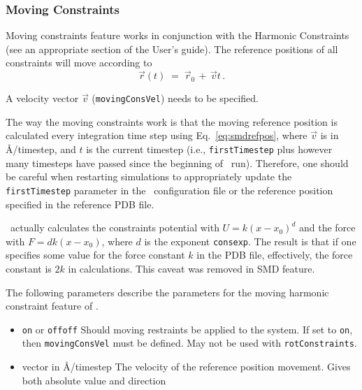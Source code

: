 \subsubsection{Moving Constraints}

Moving constraints feature works in conjunction with the Harmonic
Constraints (see an appropriate section of the User's guide).
The reference positions of all constraints
will move according to
\begin{equation}
\label{eq:smdrefpos}
   \vec r(t) \; = \; \vec r_0 \, + \, \vec v t \,.
\end{equation}

A velocity vector $\vec v$ ({\tt movingConsVel}) needs to be specified.

The way the moving constraints work is that the moving reference
position is calculated every integration time step using
Eq.~\ref{eq:smdrefpos}, where $\vec v$ is in \AA/timestep, and $t$ is the
current timestep (i.e., {\tt firstTimestep} plus however many
timesteps have passed since the beginning of \PDAC\ run). Therefore,
one should be careful when restarting simulations to appropriately
update the {\tt firstTimestep} parameter in the \PDAC\ configuration
file or the reference position specified in the reference PDB file.

 \PDAC\ actually calculates the constraints
potential with $U = k (x-x_0)^d$ and the force with $F = d k (x-x_0)$,
where $d$ is the exponent {\tt consexp}. The result is that if one
specifies some value for the force constant $k$ in the PDB file,
effectively, the force constant is $2 k$ in calculations. This caveat
was removed in SMD feature.

The following parameters describe the parameters for the
moving harmonic constraint feature of \PDAC.

\begin{itemize}

\item
{}
{{\tt on} or {\tt off}}{{\tt off}}
{Should moving restraints be applied to the system. If set
to {\tt on}, then  {\tt movingConsVel} must be defined.
May not be used with {\tt rotConstraints}.}

\item
{}
{vector in \AA/timestep}
{The velocity of the reference position movement. Gives both absolute
value and direction}

\end{itemize}

